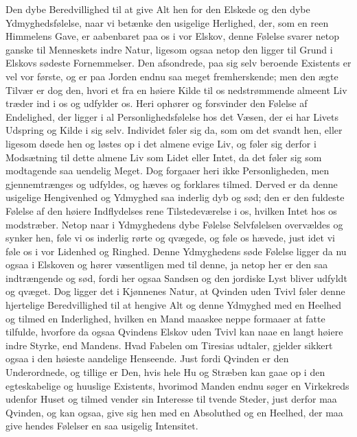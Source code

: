 \documentclass[12pt,a4paper]{book}
\newcommand{\apage}[1]{\marginnote{\footnotesize\textit{[#1]}}}
\begin{document}
Den dybe Beredvillighed til at give Alt hen for \apage{22} den Elskede og den dybe
Ydmyghedsfølelse, naar vi betænke den usigelige Herlighed, der, som en
reen Himmelens Gave, er aabenbaret paa os i vor Elskov, denne Følelse
svarer netop ganske til Menneskets indre Natur, ligesom ogsaa netop den
ligger til Grund i Elskovs sødeste Fornemmelser. Den afsondrede, paa
sig selv beroende Existents er vel vor første, og er paa Jorden endnu
saa meget fremherskende; men den ægte Tilvær er dog den, hvori et fra
en høiere Kilde til os nedstrømmende almeent Liv træder ind i os og
udfylder os. Heri ophører og forsvinder den Følelse af Endelighed, der
ligger i al Personlighedsfølelse hos det Væsen, der ei har Livets
Udspring og Kilde i sig selv. Individet føler sig da, som om det svandt
hen, eller ligesom døede hen og løstes op i det almene evige Liv, og
føler sig derfor i Modsætning til dette almene Liv som Lidet eller
Intet, da det føler sig som modtagende saa uendelig Meget. Dog forgaaer
heri ikke Personligheden, men gjennemtrænges og udfyldes, og hæves og
forklares tilmed. Derved er da denne usigelige Hengivenhed og Ydmyghed
saa inderlig dyb og sød; den er den fuldeste Følelse af den høiere
Indflydelses rene Tilstedeværelse i os, hvilken Intet hos os
modstræber. Netop naar i Ydmyghedens dybe Følelse Selvfølelsen
overvældes og synker hen, føle vi os inderlig rørte og qvægede, og føle
os hævede, just idet vi føle os i vor Lidenhed og Ringhed. Denne
Ydmyghedens søde Følelse ligger da nu ogsaa i Elskoven og hører \apage{23}
væsentligen med til denne, ja netop her er den saa indtrængende og sød,
fordi her ogsaa Sandsen og den jordiske Lyst bliver udfyldt og qvæget.
Dog ligger det i Kjønnenes Natur, at Qvinden uden Tvivl føler denne
hjertelige Beredvillighed til at hengive Alt og denne Ydmyghed med en
Heelhed og tilmed en Inderlighed, hvilken en Mand maaskee neppe
formaaer at fatte tilfulde, hvorfore da ogsaa Qvindens Elskov uden
Tvivl kan naae en langt høiere indre Styrke, end Mandens. Hvad Fabelen
om Tiresias udtaler, gjelder sikkert ogsaa i den høieste aandelige
Henseende. Just fordi Qvinden er den Underordnede, og tillige er Den,
hvis hele Hu og Stræben kan gaae op i den egteskabelige og huuslige
Existents, hvorimod Manden endnu søger en Virkekreds udenfor Huset og
tilmed vender sin Interesse til tvende Steder, just derfor maa Qvinden,
og kan ogsaa, give sig hen med en Absoluthed og en Heelhed, der maa
give hendes Følelser en saa usigelig Intensitet.
\end{document}
